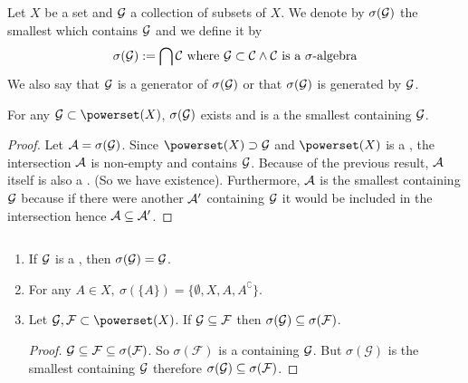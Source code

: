\begin{dfn}
	Let $X$ be a set and $\mathcal{G}$ a collection of subsets of $X$. We denote by $\sigma(\mathcal{G})$ the smallest \siga which contains $\mathcal{G}$ and we define it by
	\begin{align*}
		\sigma(\mathcal{G}) := \bigcap \mathcal{C}\text{ where } \mathcal{G} \subset \mathcal{C} \land \mathcal{C} \text{ is a } \sigma\text{-algebra}
	\end{align*}
	We also say that $\mathcal{G}$ is a generator of $\sigma(\mathcal{G})$ or that $\sigma(\mathcal{G})$ is generated by $\mathcal{G}$.
\end{dfn}

\begin{thm}
	For any $\calG \subset \powerset(X)$, $\sigma (\mathcal{G})$ exists and is a the smallest \siga containing $\mathcal{G}$.
\end{thm}

\begin{proof}
	Let $\mathcal{A} = \sigma(\mathcal{G})$. Since $\powerset(X) \supset \calG$ and $\powerset(X)$ is a \siga, the intersection $\mathcal{A}$ is non-empty and contains $\mathcal{G}$. Because of the previous result, $\mathcal{A}$ itself is also a \siga. (So we have existence). Furthermore, $\mathcal{A}$ is the smallest \siga containing $\mathcal{G}$ because if there were another \siga $\mathcal{A}'$ containing $\mathcal{G}$ it would be included in the intersection hence $\mathcal{A} \subseteq \mathcal{A}'$.
\end{proof}

\begin{remark}
	\label{rem:generators}
	$ $\newline
	\begin{enumerate}
		\item If $\mathcal{G}$ is a \siga, then $\sigma(\mathcal{G}) = \mathcal{G}$.
		\item For any $A \in X,\ \sigma(\{A\}) = \{\emptyset, X, A, A^\complement\}$.
		\item Let $\calG, \mathcal{F} \subset \powerset(X)$. If $\mathcal{G} \subseteq \mathcal{F}$ then $\sigma (\mathcal{G}) \subseteq \sigma(\mathcal{F})$.
		\begin{proof}
			$\mathcal{G} \subseteq \mathcal{F} \subseteq \sigma(\mathcal{F})$. So $\sigma(\mathcal{F})$ is a \siga containing $\mathcal{G}$. But $\sigma(\mathcal{G})$ is the smallest \siga containing $\mathcal{G}$ therefore $\sigma(\mathcal{G}) \subseteq \sigma(\mathcal{F})$.
		\end{proof}
	\end{enumerate}
\end{remark}

